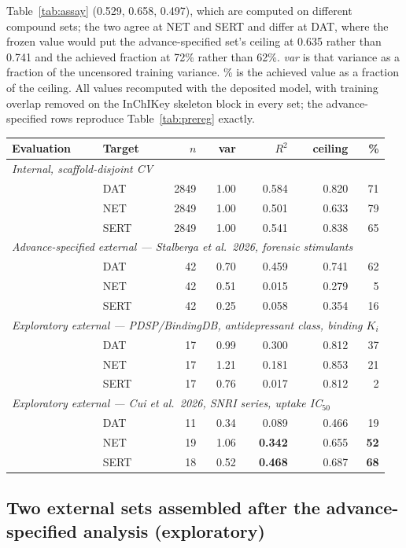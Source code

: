 \documentclass[11pt,a4paper]{article}
\begin{document}
\begin{table}[tb]
{Table~\ref{tab:assay} (0.529, 0.658, 0.497), which are computed on different compound
sets; the two agree at NET and SERT and differ at DAT, where the frozen value would put
the advance-specified set's ceiling at 0.635 rather than 0.741 and the achieved fraction at 72\%
rather than 62\%. \emph{var} is that variance as a fraction of the uncensored training variance.
\% is the achieved value as a fraction of the ceiling. All values recomputed with the
deposited model, with training overlap removed on the InChIKey skeleton block in every
set; the advance-specified rows reproduce Table~\ref{tab:prereg} exactly.}
\label{tab:extceiling}
\begin{tabular}{llrrrrr}
\toprule
Evaluation & Target & $n$ & var & $R^2$ & ceiling & \% \\
\midrule
\multicolumn{7}{l}{\textit{Internal, scaffold-disjoint CV}}\\
 & DAT  & 2849 & 1.00 & 0.584 & 0.820 & 71 \\
 & NET  & 2849 & 1.00 & 0.501 & 0.633 & 79 \\
 & SERT & 2849 & 1.00 & 0.541 & 0.838 & 65 \\
\midrule
\multicolumn{7}{l}{\textit{Advance-specified external --- Stalberga et al.\ 2026, forensic stimulants}}\\
 & DAT  & 42 & 0.70 & 0.459 & 0.741 & 62 \\
 & NET  & 42 & 0.51 & 0.015 & 0.279 &  5 \\
 & SERT & 42 & 0.25 & 0.058 & 0.354 & 16 \\
\midrule
\multicolumn{7}{l}{\textit{Exploratory external --- PDSP/BindingDB, antidepressant class, binding $K_i$}}\\
 & DAT  & 17 & 0.99 & 0.300 & 0.812 & 37 \\
 & NET  & 17 & 1.21 & 0.181 & 0.853 & 21 \\
 & SERT & 17 & 0.76 & 0.017 & 0.812 &  2 \\
\midrule
\multicolumn{7}{l}{\textit{Exploratory external --- Cui et al.\ 2026, SNRI series, uptake IC$_{50}$}}\\
 & DAT  & 11 & 0.34 & 0.089 & 0.466 & 19 \\
 & NET  & 19 & 1.06 & \textbf{0.342} & 0.655 & \textbf{52} \\
 & SERT & 18 & 0.52 & \textbf{0.468} & 0.687 & \textbf{68} \\
\bottomrule
\end{tabular}
\end{table}


\subsection{Two external sets assembled after the advance-specified analysis (exploratory)}
\label{sec:newexternal}
\end{document}
